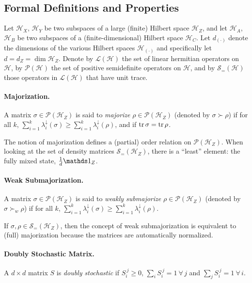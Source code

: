 \documentclass[11pt,a4paper]{article}
\def\Hs{\mathscr{H}}%
\newcommand{\lD}{\lambda^\downarrow}
\newcommand{\LOps}{\mathscr{L}}
\newcommand{\POps}{\mathscr{P}}
\newcommand{\DOps}{\mathscr{S}_=}
\begin{document}
\subsection{Formal Definitions and Properties}

Let $\Hs_X$, $\Hs_Y$ be two subspaces of a large (finite) Hilbert space $\Hs_Z$, and let
$\Hs_A$, $\Hs_B$ be two subspaces of a (finite-dimensional) Hilbert space $\Hs_C$. Let $d_{(\cdot)}$ denote
 the dimensions of the various Hilbert
spaces $\Hs_{(\cdot)}$ and specifically let $d=d_Z=\dim\Hs_Z$. Denote by $\LOps(\Hs)$ the set of linear
hermitian operators on $\Hs$, by $\POps(\Hs)$ the set of positive semidefinite operators on $\Hs$, and
by $\DOps(\Hs)$ those operators in $\LOps(\Hs)$ that have unit trace.

\paragraph{Majorization.} A matrix $\sigma\in\POps(\Hs_Z)$ is said to {\em majorize} $\rho\in\POps(\Hs_Z)$
(denoted by $\sigma\succ\rho$) if for all $k$, $\sum_{i=1}^k \lD_i(\sigma) \geqslant \sum_{i=1}^k \lD_i(\rho)$,
and if $\operatorname{tr}\sigma=\operatorname{tr}\rho$.

The notion of majorization defines a (partial) order relation on $\POps(\Hs_Z)$. When looking at the
set of density matrices $\DOps(\Hs_Z)$, there is a ``least'' element: the fully mixed state,
$\frac{1}{d}\Ident_Z$.

\paragraph{Weak Submajorization.} A matrix $\sigma\in\POps(\Hs_Z)$ is said to {\em weakly submajorize}
$\rho\in\POps(\Hs_Z)$ (denoted by $\sigma\succ_w\rho$) if for all $k$,
$\sum_{i=1}^k \lD_i(\sigma) \geqslant \sum_{i=1}^k \lD_i(\rho)$.

\begin{remark*}
  If $\sigma,\rho\in\DOps(\Hs_Z)$, then the concept of weak submajorization is equivalent to (full)
  majorization because the matrices are automatically normalized.
\end{remark*}

\paragraph{Doubly Stochastic Matrix.} A $d\times d$ matrix $S$ is {\em doubly stochastic} if
$S_i^{~j}\geqslant 0$, $\sum_i S_i^{~j} = 1~\forall\,j$ and $\sum_j S_i^{~j} = 1~\forall\,i$.
\end{document}
